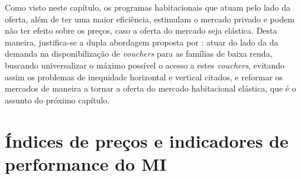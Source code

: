\documentclass[
	12pt,				%
	oneside,			%
	a4paper,			%
	chapter=TITLE,		%
	section=TITLE,		%
	english,			%
	brazil				%
	]{abntex2}
\begin{document}
\begin{refsection}
Como visto neste capítulo, os programas habitacionais que atuam pelo lado
da oferta, além de ter uma maior eficiência, estimulam o mercado privado e podem
não ter efeito sobre os preços, caso a oferta do mercado seja elástica. Desta
maneira, justifica-se a dupla abordagem proposta por
\textcite{malpezzi_affordable_2018_2}: atuar do lado da da demanda na disponibilização de
\emph{vouchers} para as famílias de baixa renda, buscando universalizar o máximo
possível o acesso a estes \emph{vouchers}, evitando assim os problemas de inequidade
horizontal e vertical citados, e reformar os mercados de maneira a tornar a
oferta do mercado habitacional elástica, que é o assunto do próximo capítulo.

\printbibliography[heading=subbibintoc]
\end{refsection}
\hypertarget{indices}{%
\chapter{\texorpdfstring{Índices de preços e indicadores de performance do \gls{MI}}{Índices de preços e indicadores de performance do }}\label{indices}}
\end{document}
